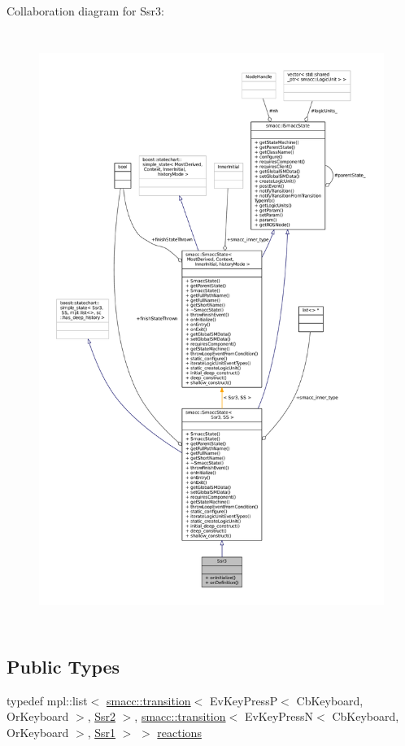Collaboration diagram for Ssr3\+:
\nopagebreak
\begin{figure}[H]
\begin{center}
\leavevmode
\includegraphics[height=550pt]{structSsr3__coll__graph}
\end{center}
\end{figure}
\subsection*{Public Types}
\begin{DoxyCompactItemize}
\item 
typedef mpl\+::list$<$ \hyperlink{classsmacc_1_1transition}{smacc\+::transition}$<$ Ev\+Key\+PressP$<$ Cb\+Keyboard, Or\+Keyboard $>$, \hyperlink{structSsr2}{Ssr2} $>$, \hyperlink{classsmacc_1_1transition}{smacc\+::transition}$<$ Ev\+Key\+PressN$<$ Cb\+Keyboard, Or\+Keyboard $>$, \hyperlink{structSsr1}{Ssr1} $>$ $>$ \hyperlink{structSsr3_a9b234c7ea95f593cd1fd4049e6f256d8}{reactions}
\end{DoxyCompactItemize}
